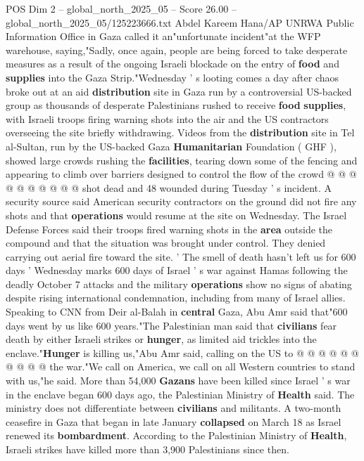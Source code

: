 \begin{textsample}{POS Dim 2 – global\_north\_2025\_05 – Score 26.00 – global\_north\_2025\_05/125223666.txt}
Abdel Kareem Hana/AP UNRWA Public Information Office in Gaza called it an"unfortunate incident"at the WFP warehouse, saying,"Sadly, once again, people are being forced to take desperate measures as a result of the ongoing Israeli blockade on the entry of \textbf{food} and \textbf{supplies} into the Gaza Strip."Wednesday ' s looting comes a day after chaos broke out at an aid \textbf{distribution} site in Gaza run by a controversial US-backed group as thousands of desperate Palestinians rushed to receive \textbf{food} \textbf{supplies}, with Israeli troops firing warning shots into the air and the US contractors overseeing the site briefly withdrawing.
Videos from the \textbf{distribution} site in Tel al-Sultan, run by the US-backed Gaza \textbf{Humanitarian} Foundation ( GHF ), showed large crowds rushing the \textbf{facilities}, tearing down some of the fencing and appearing to climb over barriers designed to control the flow of the crowd @ @ @ @ @ @ @ @ @ @ shot dead and 48 wounded during Tuesday ' s incident.
A security source said American security contractors on the ground did not fire any shots and that \textbf{operations} would resume at the site on Wednesday.
The Israel Defense Forces said their troops fired warning shots in the \textbf{area} outside the compound and that the situation was brought under control.
They denied carrying out aerial fire toward the site. ' The smell of death hasn't left us for 600 days ' Wednesday marks 600 days of Israel ' s war against Hamas following the deadly October 7 attacks and the military \textbf{operations} show no signs of abating despite rising international condemnation, including from many of Israel allies.
Speaking to CNN from Deir al-Balah in \textbf{central} Gaza, Abu Amr said that"600 days went by us like 600 years."The Palestinian man said that \textbf{civilians} fear death by either Israeli strikes or \textbf{hunger}, as limited aid trickles into the enclave."\textbf{Hunger} is killing us,"Abu Amr said, calling on the US to @ @ @ @ @ @ @ @ @ @ the war."We call on America, we call on all Western countries to stand with us,"he said.
More than 54,000 \textbf{Gazans} have been killed since Israel ' s war in the enclave began 600 days ago, the Palestinian Ministry of \textbf{Health} said.
The ministry does not differentiate between \textbf{civilians} and militants.
A two-month ceasefire in Gaza that began in late January \textbf{collapsed} on March 18 as Israel renewed its \textbf{bombardment}.
According to the Palestinian Ministry of \textbf{Health}, Israeli strikes have killed more than 3,900 Palestinians since then.

\end{textsample}

